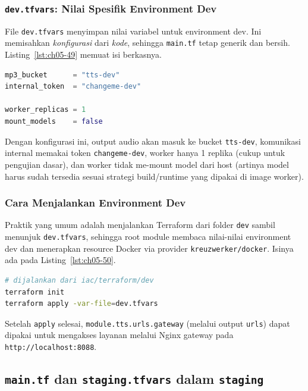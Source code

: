 \subsubsection{\texttt{dev.tfvars}: Nilai Spesifik Environment Dev}

File \texttt{dev.tfvars} menyimpan nilai variabel untuk environment dev. Ini memisahkan \textit{konfigurasi} dari \textit{kode}, sehingga \texttt{main.tf} tetap generik dan bersih. Listing~\ref{lst:ch05-49} memuat isi berkasnya.

\begin{lstlisting}[language=terraform, caption={Isi berkas dev.tfvars}, label={lst:ch05-49}]
mp3_bucket      = "tts-dev"
internal_token  = "changeme-dev"

worker_replicas = 1
mount_models    = false
\end{lstlisting}

Dengan konfigurasi ini, output audio akan masuk ke bucket \texttt{tts-dev}, komunikasi internal memakai token \texttt{changeme-dev}, worker hanya 1 replika (cukup untuk pengujian dasar), dan worker tidak me-mount model dari host (artinya model harus sudah tersedia sesuai strategi build/runtime yang dipakai di image worker).

\subsubsection{Cara Menjalankan Environment Dev}

Praktik yang umum adalah menjalankan Terraform dari folder \texttt{dev} sambil menunjuk \texttt{dev.tfvars}, sehingga root module membaca nilai-nilai environment dev dan menerapkan resource Docker via provider \texttt{kreuzwerker/docker}. Isinya ada pada Listing~\ref{lst:ch05-50}.

\begin{lstlisting}[language=bash, caption={Menjalankan environment dev}, label={lst:ch05-50}]
# dijalankan dari iac/terraform/dev
terraform init
terraform apply -var-file=dev.tfvars
\end{lstlisting}

Setelah \texttt{apply} selesai, \texttt{module.tts.urls.gateway} (melalui output \texttt{urls}) dapat dipakai untuk mengakses layanan melalui Nginx gateway pada \texttt{http://localhost:8088}.

\subsection{\texttt{main.tf} dan \texttt{staging.tfvars} dalam \texttt{staging}}

